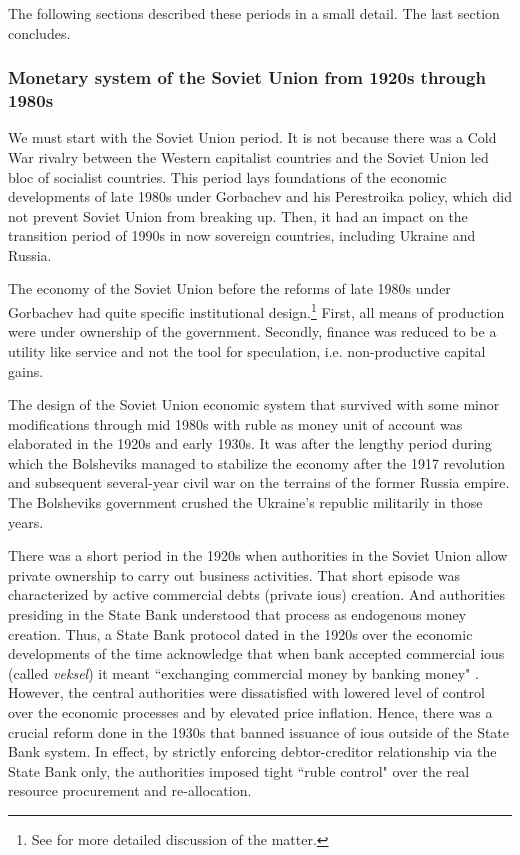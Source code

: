 The following sections described these periods in a small detail. The
last section concludes.

\subsubsection{Monetary system of the Soviet Union from 1920s through 1980s}

We must start with the Soviet Union period. It is not because there was
a Cold War rivalry between the Western capitalist countries and the
Soviet Union led bloc of socialist countries. This period lays
foundations of the economic developments of late 1980s under Gorbachev
and his Perestroika policy, which did not prevent Soviet Union from
breaking up. Then, it had an impact on the transition period of 1990s in
now sovereign countries, including Ukraine and Russia.

The economy of the Soviet Union before the reforms of late 1980s under
Gorbachev had quite specific institutional design.\footnote{See \citep{valchyshen_ru98} for more detailed discussion of the matter.} First, all means
of production were under ownership of the government. Secondly, finance
was reduced to be a utility like service and not the tool for
speculation, i.e. non-productive capital gains.

The design of the Soviet Union economic system that survived with some
minor modifications through mid 1980s with ruble as money unit of
account was elaborated in the 1920s and early 1930s. It was after the
lengthy period during which the Bolsheviks managed to stabilize the
economy after the 1917 revolution and subsequent several-year civil war
on the terrains of the former Russia empire. The Bolsheviks government
crushed the Ukraine's republic militarily in those years.

There was a short period in the 1920s when authorities in the Soviet
Union allow private ownership to carry out business activities. That
short episode was characterized by active commercial debts (private
\acp{iou}) creation. And authorities presiding in the State Bank understood
that process as endogenous money creation. Thus, a State Bank protocol
dated in the 1920s over the economic developments of the time
acknowledge that when bank accepted commercial \acp{iou} (called \textit{veksel}) it
meant ``exchanging commercial money by banking money"
\citep[pp.~40-44]{cbr2008}. However, the central authorities were dissatisfied
with lowered level of control over the economic processes and by
elevated price inflation. Hence, there was a crucial reform done in the
1930s that banned issuance of \acp{iou} outside of the State Bank system. In
effect, by strictly enforcing debtor-creditor relationship via the State
Bank only, the authorities imposed tight ``ruble control" over the real
resource procurement and re-allocation.

